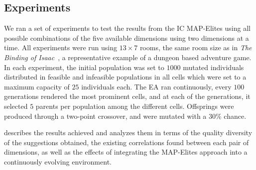 



\subsection{Experiments}

We ran a set of experiments to test the results from the IC MAP-Elites using all possible combinations of the five available dimensions using two dimensions at a time. All experiments were run using $13\times7$ rooms, the same room size as in \emph{The Binding of Isaac}~, a representative example of a dungeon based adventure game.
In each experiment, the initial population was set to $1000$ mutated individuals distributed in feasible and infeasible populations in all cells which were set to a maximum capacity of $25$ individuals each. The EA ran continuously, every $100$ generations rendered the most prominent cells, and at each of the generations, it selected $5$ parents per population among the different cells. Offsprings were produced through a two-point crossover, and were mutated with a 30\% chance.  %

 describes the results achieved and analyzes them in terms of the quality diversity of the suggestions obtained, the existing correlations found between each pair of dimensions, as well as the effects of integrating the MAP-Elites approach into a continuously evolving environment.

